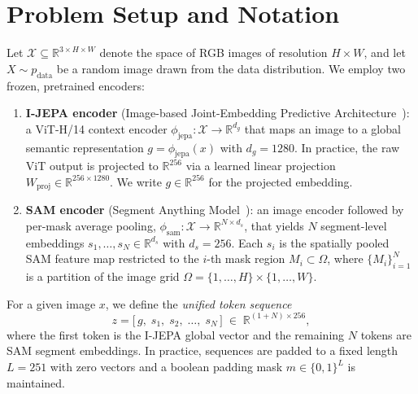 \documentclass[12pt]{article}
\begin{document}
\section{Problem Setup and Notation}
\label{sec:setup}

Let $\mathcal{X} \subseteq \mathbb{R}^{3 \times H \times W}$ denote the
space of RGB images of resolution $H \times W$, and let
$X \sim p_{\mathrm{data}}$ be a random image drawn from the data distribution.
We employ two frozen, pretrained encoders:
\begin{enumerate}
    \item \textbf{I-JEPA encoder}
    (Image-based Joint-Embedding Predictive Architecture~\cite{assran2023ijepa}):
    a ViT-H/14 context encoder
    $\phi_{\mathrm{jepa}} : \mathcal{X} \to \mathbb{R}^{d_g}$
    that maps an image to a global semantic representation $g = \phi_{\mathrm{jepa}}(x)$
    with $d_g = 1280$.
    In practice, the raw ViT output is projected to $\mathbb{R}^{256}$ via
    a learned linear projection $W_{\mathrm{proj}} \in \mathbb{R}^{256 \times 1280}$.
    We write $g \in \mathbb{R}^{256}$ for the projected embedding.
    \item \textbf{SAM encoder}
    (Segment Anything Model~\cite{kirillov2023sam}):
    an image encoder followed by per-mask average pooling,
    $\phi_{\mathrm{sam}} : \mathcal{X} \to \mathbb{R}^{N \times d_s}$,
    that yields $N$ segment-level embeddings
    $s_1, \ldots, s_N \in \mathbb{R}^{d_s}$
    with $d_s = 256$.
    Each $s_i$ is the spatially pooled SAM feature map restricted to
    the $i$-th mask region $M_i \subset \Omega$,
    where $\{M_i\}_{i=1}^{N}$ is a partition of the image grid
    $\Omega = \{1,\ldots,H\}\times\{1,\ldots,W\}$.
\end{enumerate}

For a given image $x$, we define the \emph{unified token sequence}
\begin{equation}\label{eq:token-sequence}
    z = \bigl[\, g,\; s_1,\; s_2,\; \ldots,\; s_N \,\bigr]
    \;\in\; \mathbb{R}^{(1+N) \times 256},
\end{equation}
where the first token is the I-JEPA global vector and the remaining
$N$ tokens are SAM segment embeddings.
In practice, sequences are padded to a fixed length $L = 251$ with
zero vectors and a boolean padding mask $m \in \{0,1\}^L$ is maintained.
\end{document}
